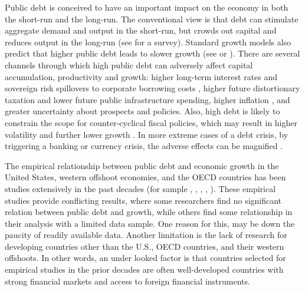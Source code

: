 \documentclass[12pt, titlepage]{article}
\numberwithin{equation}{section}
\begin{document}
Public debt is conceived to have an important impact on the economy in both the short-run and the long-run. The conventional view is that debt can stimulate aggregate demand and output in the short-run, but crowds out capital and reduces output in the long-run (see \cite{Mankiw1999} for a survey). Standard growth models also predict that higher public debt leads to slower growth (see \cite{Saint-Paul91} or \cite{Aizeman07}). There are several channels through which high public debt can adversely affect capital accumulation, productivity and growth: higher long-term interest rates and sovereign risk spillovers to corporate borrowing costs \citep{Gale2003, Cecchetti2015, Corsetti2013}, higher future distortionary taxation and lower future public infrastructure spending, higher inflation \citep{Barro95}, and greater uncertainty about prospects and policies. Also, high debt
is likely to constrain the scope for counter-cyclical fiscal policies, which may result in higher volatility and further lower growth \citep{Woo2015}. In more extreme cases of a debt crisis, by triggering a banking or currency crisis, the adverse effects can be magnified \citep{Reinhart2011, Reinhart2012}.

The empirical relationship between public debt and economic growth in the United States, western offshoot economies, and the OECD countries has been studies extensively in the past decades (for sample \cite{Dwyer82}, \cite{Ahking85}, \cite{Protopapadakis87}, \cite{King1985}, \cite{Woo2015}). These empirical studies provide conflicting results, where some researchers find no significant relation between public debt and growth, while others find some relationship in their analysis with a limited data sample. One reason for this, may be down the paucity of readily available data. Another limitation is the lack of research for developing countries other than the U.S., OECD countries, and their western offshoots.  In other words, an under looked factor is that countries selected for empirical studies in the prior decades are often well-developed countries with strong financial markets and access to foreign financial instruments. 
\end{document}
